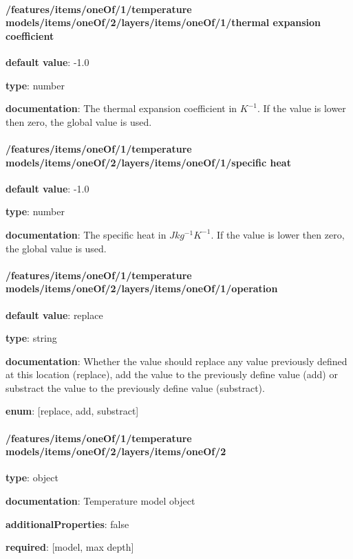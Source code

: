 \begin{itemized}
\end{itemized}\paragraph{/features/items/oneOf/1/temperature models/items/oneOf/2/layers/items/oneOf/1/thermal expansion coefficient} \begin{itemized}
\item {\bf default value}: -1.0
\item {\bf type}: number
\item {\bf documentation}: The thermal expansion coefficient in $K^{-1}$. If the value is lower then zero, the global value is used.
\end{itemized}\paragraph{/features/items/oneOf/1/temperature models/items/oneOf/2/layers/items/oneOf/1/specific heat} \begin{itemized}
\item {\bf default value}: -1.0
\item {\bf type}: number
\item {\bf documentation}: The specific heat in $J kg^{-1} K^{-1}$. If the value is lower then zero, the global value is used.
\end{itemized}\paragraph{/features/items/oneOf/1/temperature models/items/oneOf/2/layers/items/oneOf/1/operation} \begin{itemized}
\item {\bf default value}: replace
\item {\bf type}: string
\item {\bf documentation}: Whether the value should replace any value previously defined at this location (replace), add the value to the previously define value (add) or substract the value to the previously define value (substract).
\item {\bf enum}: [replace, add, substract]\end{itemized}\paragraph{/features/items/oneOf/1/temperature models/items/oneOf/2/layers/items/oneOf/2} \begin{itemized}
\item {\bf type}: object
\item {\bf documentation}: Temperature model object
\item {\bf additionalProperties}: false
\item {\bf required}: [model, max depth]\end{itemized}
